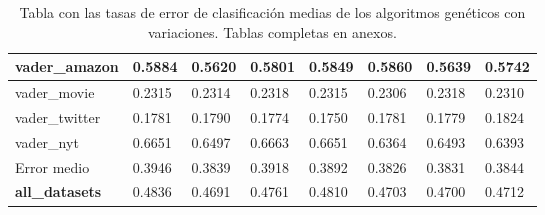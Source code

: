 \begin{table} [H]
{\begin{tabular}{|l|b{1.7cm}b{1.8cm}b{1.7cm}llll|}
			vader\_amazon & 0.5884 &\cellcolor{greentable} 0.5620 &0.5801 & 0.5849&0.5860&0.5639&0.5742\\ \hline
			vader\_movie & 0.2315 & 0.2314 & 0.2318  & 0.2315&\cellcolor{greentable}0.2306&0.2318&0.2310\\ \hline
			vader\_twitter & 0.1781 & 0.1790 & 0.1774 & \cellcolor{greentable}0.1750&0.1781&0.1779&0.1824 \\ \hline
			vader\_nyt & 0.6651& 0.6497 & 0.6663 & 0.6651&\cellcolor{greentable}0.6364&0.6493&0.6393\\ \hline
			Error medio & 0.3946 & 0.3839 & 0.3918 & 0.3892 & 0.3826 & 0.3831 & 0.3844 \\ \hline
			\textbf{all\_datasets} &0.4836&0.4691&0.4761&0.4810&0.4703&0.4700&0.4712\\ \hline
		\end{tabular} 
	}
	\caption{Tabla con las tasas de error de clasificación medias de los algoritmos genéticos con variaciones. Tablas completas en anexos.}
	\label{table:mejoras}
\end{table}

